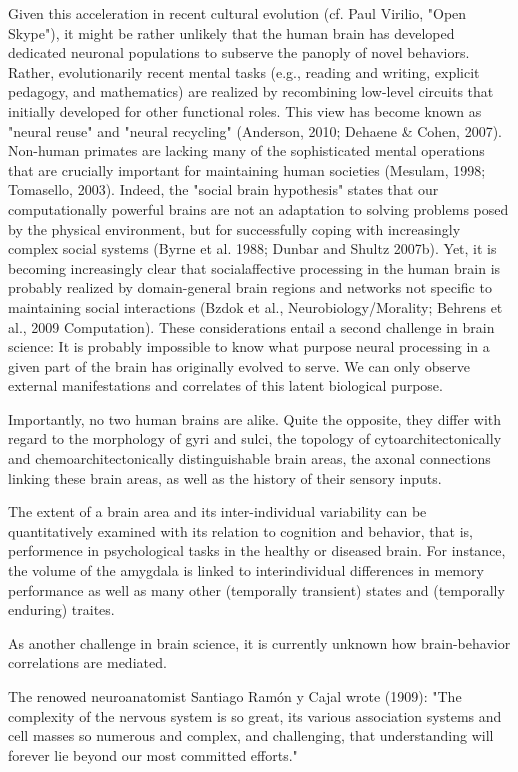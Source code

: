 \documentclass[authoryear,review,3p]{elsarticle}
\begin{document}
Given this acceleration in recent cultural evolution
(cf. Paul Virilio, "Open Skype"),
it might be
rather unlikely that the human brain has developed dedicated
neuronal populations to subserve the panoply of novel behaviors.
Rather, evolutionarily recent mental tasks
(e.g., reading and writing, explicit pedagogy, and mathematics)
are realized by recombining low-level circuits that initially
developed for other functional roles.
This view has become known as
"neural reuse" and "neural recycling"
(Anderson, 2010; Dehaene & Cohen, 2007).
Non-human primates are lacking many of the sophisticated
mental operations that
are crucially important for maintaining human societies
(Mesulam, 1998; Tomasello, 2003).
Indeed,
the "social brain hypothesis" states that our
computationally powerful brains are not an adaptation to
solving problems posed by the physical environment,
but for successfully coping with increasingly complex social systems
(Byrne et al. 1988; Dunbar and Shultz 2007b).
Yet, it is becoming increasingly clear that socialaffective processing
in the human brain is probably realized by domain-general
brain regions and networks not specific to maintaining social interactions
(Bzdok et al., Neurobiology/Morality; Behrens et al., 2009 Computation).
These considerations entail a second challenge in brain science:
It is probably impossible to know what purpose neural
processing in a given part of the brain has originally evolved to serve.
We can only observe external manifestations and correlates of
this latent biological purpose.


Importantly,
no two human brains are alike.
Quite the opposite,
they differ with regard to
the morphology of gyri and sulci,
the topology of cytoarchitectonically and chemoarchitectonically
distinguishable brain areas,
the axonal connections linking these brain areas,
as well as the history of their sensory inputs.


The extent of a brain area and its inter-individual variability
can be quantitatively examined with its relation to cognition and behavior,
that is,
performence in psychological tasks in the healthy or diseased brain.
For instance, the volume of the amygdala is linked to
interindividual differences in memory performance as well as
many other (temporally transient) states and
(temporally enduring) traites.

As another challenge in brain science,
it is currently unknown how
brain-behavior correlations are mediated.

The renowed neuroanatomist Santiago Ram\'{o}n y Cajal wrote (1909):
"The complexity of the nervous system is so great,
its various association systems and cell masses so numerous and
complex, and challenging,
that understanding will forever lie beyond our most committed efforts."
\end{document}
